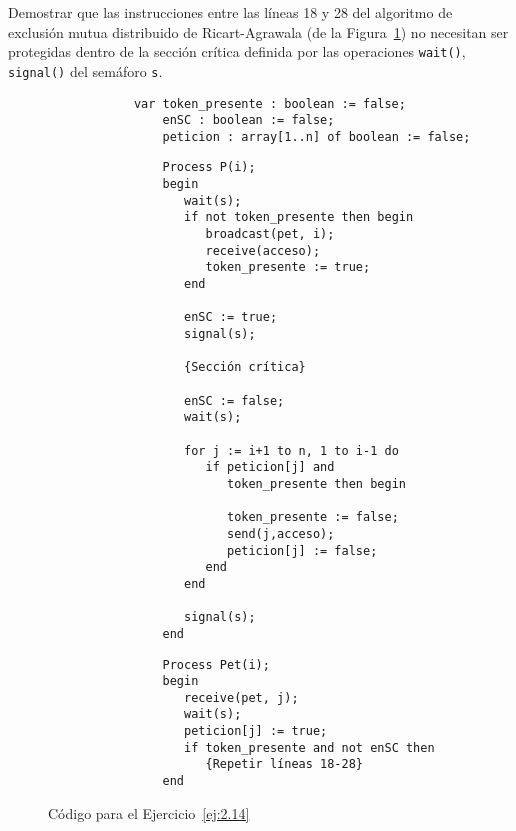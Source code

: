 \begin{ejercicio}\label{ej:2.14} %
    Demostrar que las instrucciones entre las líneas 18 y 28 del algoritmo de exclusión mutua distribuido de Ricart-Agrawala (de la Figura~\ref{fig:cod_14}) no necesitan ser protegidas dentro de la sección crítica definida por las operaciones \verb|wait()|, \verb|signal()| del semáforo \verb|s|.
    \begin{figure}[H]
        \centering
        \begin{verbatim}
            var token_presente : boolean := false;
                enSC : boolean := false;
                peticion : array[1..n] of boolean := false;
        \end{verbatim}
        \setlength{\columnsep}{1cm}
        \begin{multicols}{2}
            \begin{verbatim}
                Process P(i);
                begin
                   wait(s);
                   if not token_presente then begin
                      broadcast(pet, i);
                      receive(acceso);
                      token_presente := true;
                   end

                   enSC := true;
                   signal(s);

                   {Sección crítica}

                   enSC := false;
                   wait(s);

                   for j := i+1 to n, 1 to i-1 do
                      if peticion[j] and 
                         token_presente then begin

                         token_presente := false;
                         send(j,acceso);
                         peticion[j] := false;
                      end
                   end

                   signal(s);
                end
            \end{verbatim}
            \begin{verbatim}
                Process Pet(i);
                begin
                   receive(pet, j);
                   wait(s);
                   peticion[j] := true;
                   if token_presente and not enSC then
                      {Repetir líneas 18-28}
                end
            \end{verbatim}
        \end{multicols}
        \caption{Código para el Ejercicio~\ref{ej:2.14}}
        \label{fig:cod_14}
    \end{figure}
\end{ejercicio}

